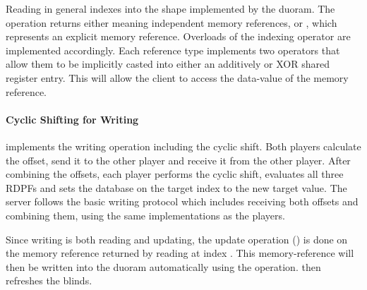 Reading in general indexes into the shape implemented by the duoram.
The operation returns either  meaning independent memory references, or , which represents an explicit memory reference.
Overloads of the indexing operator are implemented accordingly.
Each reference type implements two operators that allow them to be implicitly casted into either an additively or XOR shared register entry.
This will allow the client to access the data-value of the memory reference.

\paragraph{Cyclic Shifting for Writing}
 implements the writing operation including the cyclic shift.
Both players calculate the offset, send it to the other player and receive it from the other player.
After combining the offsets, each player performs the cyclic shift, evaluates all three RDPFs and sets the database on the target index to the new target value.
The server follows the basic writing protocol which includes receiving both offsets and combining them, using the same implementations as the players.

Since writing is both reading and updating, the update operation (\code{+=}) is done on the memory reference returned by reading at index .
This memory-reference will then be written into the duoram automatically using the  operation.
 then refreshes the blinds.